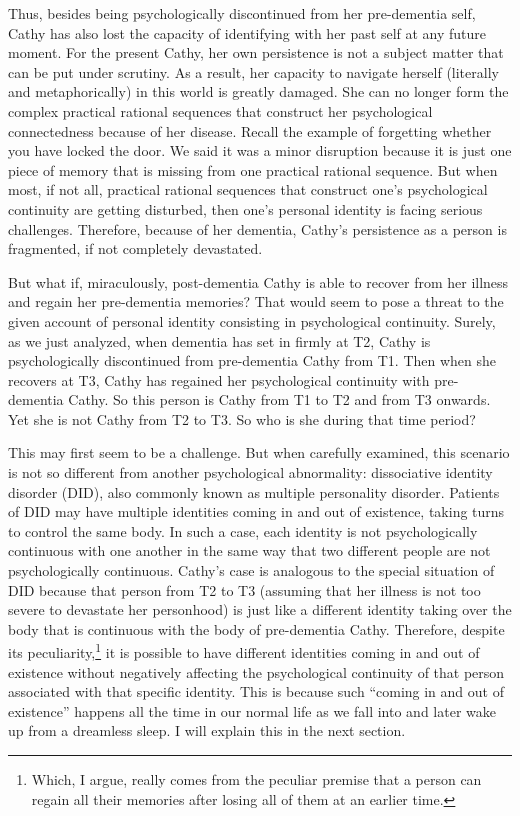 Thus, besides being psychologically discontinued from her pre-dementia
self, Cathy has also lost the capacity of identifying with her past self
at any future moment. For the present Cathy, her own persistence is not
a subject matter that can be put under scrutiny. As a result, her
capacity to navigate herself (literally and metaphorically) in this
world is greatly damaged. She can no longer form the complex practical
rational sequences that construct her psychological connectedness
because of her disease. Recall the example of forgetting whether you
have locked the door. We said it was a minor disruption because it is
just one piece of memory that is missing from one practical rational
sequence. But when most, if not all, practical rational sequences that
construct one's psychological continuity are getting disturbed, then
one's personal identity is facing serious challenges. Therefore, because
of her dementia, Cathy's persistence as a person is fragmented, if not
completely devastated.

But what if, miraculously, post-dementia Cathy is able to recover from
her illness and regain her pre-dementia memories? That would seem to
pose a threat to the given account of personal identity consisting in
psychological continuity. Surely, as we just analyzed, when dementia has
set in firmly at T2, Cathy is psychologically discontinued from
pre-dementia Cathy from T1. Then when she recovers at T3, Cathy has
regained her psychological continuity with pre-dementia Cathy. So this
person is Cathy from T1 to T2 and from T3 onwards. Yet she is not Cathy
from T2 to T3. So who is she during that time period?

This may first seem to be a challenge. But when carefully examined, this
scenario is not so different from another psychological abnormality:
dissociative identity disorder (DID), also commonly known as multiple
personality disorder. Patients of DID may have multiple identities
coming in and out of existence, taking turns to control the same body.
In such a case, each identity is not psychologically continuous with one
another in the same way that two different people are not
psychologically continuous. Cathy's case is analogous to the special
situation of DID because that person from T2 to T3 (assuming that her
illness is not too severe to devastate her personhood) is just like a
different identity taking over the body that is continuous with the body
of pre-dementia Cathy. Therefore, despite its peculiarity,\footnote{Which,
  I argue, really comes from the peculiar premise that a person can
  regain all their memories after losing all of them at an earlier time.}
it is possible to have different identities coming in and out of
existence without negatively affecting the psychological continuity of
that person associated with that specific identity. This is because such
``coming in and out of existence'' happens all the time in our normal
life as we fall into and later wake up from a dreamless sleep. I will
explain this in the next section.

